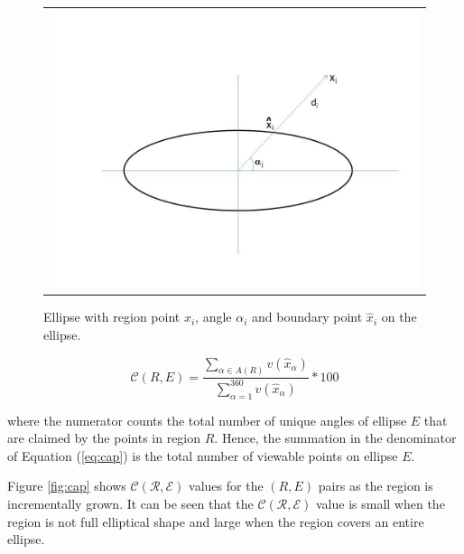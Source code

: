 \documentclass[preprint]{iucr}              %
\begin{document}
\begin{figure}
\centering
\begin{tabular}{c}
\includegraphics[width=.8\linewidth]{Figures/Ellipse_fig_new1.jpg}     
\end{tabular}
\caption{Ellipse with region point $x_i$, angle $\alpha_i$ and boundary point $\hat{x}_i$ on the ellipse.}
\label{fig:ellipse}
\end{figure}

\begin{equation} \label{eq:cap}
    \mathcal{C}(R,E) = \frac{\sum_{\alpha \in A(R)} v(\hat{x}_\alpha)} {\sum_{\alpha = 1}^{360} v(\hat{x}_\alpha)} * 100
\end{equation}

where the numerator counts the total number of unique angles of ellipse $E$ that are claimed by the points in region $R$. Hence, the summation in the denominator of Equation (\ref{eq:cap}) is the total number of viewable points on ellipse $E$.

Figure \ref{fig:cap} shows $\mathcal{C(R,E)}$ values for the $(R, E)$ pairs as the region is incrementally grown. It can be seen that the $\mathcal{C(R,E)}$ value is small when the region is not full elliptical shape and large when the region covers an entire ellipse.
\end{document}
